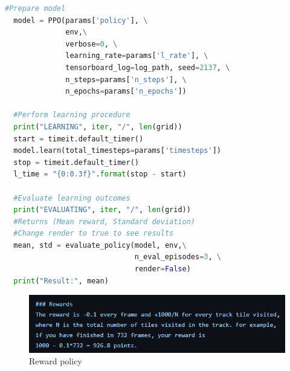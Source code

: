 \documentclass[runningheads]{llncs}
\begin{document}
\begin{lstlisting}[caption={Model creation}, language=Python, label={lst:model}]
  #Prepare model
  model = PPO(params['policy'], \
              env,\
              verbose=0, \
              learning_rate=params['l_rate'], \
              tensorboard_log=log_path, seed=2137, \
              n_steps=params['n_steps'], \
              n_epochs=params['n_epochs'])

  #Perform learning procedure
  print("LEARNING", iter, "/", len(grid))
  start = timeit.default_timer()
  model.learn(total_timesteps=params['timesteps'])
  stop = timeit.default_timer()
  l_time = "{0:0.3f}".format(stop - start)

  #Evaluate learning outcomes
  print("EVALUATING", iter, "/", len(grid))
  #Returns (Mean reward, Standard deviation)
  #Change render to true to see results
  mean, std = evaluate_policy(model, env,\
                              n_eval_episodes=3, \
                              render=False)
  print("Result:", mean)
\end{lstlisting}

\begin{figure}
  \includegraphics[width=\textwidth]{Screenshots/rewards.png}
  \caption{Reward policy}
  \label{fig:reward}
\end{figure}
\end{document}
